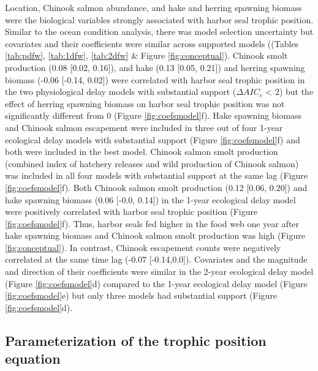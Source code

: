 \documentclass [11pt, proquest] {uwthesis}[2015/03/03]
\begin{document}
Location, Chinook salmon abundance, and hake and herring spawning
biomass were the biological variables strongly associated with harbor
seal trophic position. Similar to the ocean condition analysis, there
was model selection uncertainty but covariates and their coefficients
were similar across supported models ((Tables \ref{tab:pdfw},
\ref{tab:1dfw}, \ref{tab:2dfw} \& Figure \ref{fig:conceptual}). Chinook
smolt production (0.08 {[}0.02, 0.16{]}), and hake (0.13 {[}0.05,
0.21{]}) and herring spawning biomass (-0.06 {[}-0.14, 0.02{]}) were
correlated with harbor seal trophic position in the two physiological
delay models with substantial support (\(\Delta AIC_c\) \textless{} 2)
but the effect of herring spawning biomass on harbor seal trophic
position was not significantly different from 0 (Figure
\ref{fig:coefsmodel}f). Hake spawning biomass and Chinook salmon
escapement were included in three out of four 1-year ecological delay
models with substantial support (Figure \ref{fig:coefsmodel}f) and both
were included in the best model. Chinook salmon smolt production
(combined index of hatchery releases and wild production of Chinook
salmon) was included in all four models with substantial support at the
same lag (Figure \ref{fig:coefsmodel}f). Both Chinook salmon smolt
production (0.12 {[}0.06, 0.20{]}) and hake spawning biomass (0.06
{[}-0.0, 0.14{]}) in the 1-year ecological delay model were positively
correlated with harbor seal trophic position (Figure
\ref{fig:coefsmodel}f). Thus, harbor seals fed higher in the food web
one year after hake spawning biomass and Chinook salmon smolt production
was high (Figure \ref{fig:conceptual}). In contrast, Chinook escapement
counts were negatively correlated at the same time lag (-0.07
{[}-0.14,0.0{]}). Covariates and the magnitude and direction of their
coefficients were similar in the 2-year ecological delay model (Figure
\ref{fig:coefsmodel}d) compared to the 1-year ecological delay model
(Figure \ref{fig:coefsmodel}e) but only three models had substantial
support (Figure \ref{fig:coefsmodel}d).

\subsection{Parameterization of the trophic position
equation}\label{parameterization-of-the-trophic-position-equation}
\end{document}
